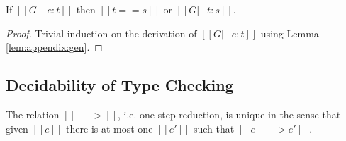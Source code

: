 \begin{lem}\label{lem:appendix:corrtyp}
    If $[[G |- e:t]]$ then $[[t == s]]$ or $[[G |- t : s]]$.
\end{lem}

\begin{proof}
    Trivial induction on the derivation of $[[G |- e:t]]$ using Lemma
\ref{lem:appendix:gen}.
\end{proof}

\subsection{Decidability of Type Checking}
\begin{lem}\label{lem:appendix:unired}
	The relation $[[-->]]$, i.e. one-step reduction, is unique in the sense that
given $[[e]]$ there is at most one $[[e']]$ such that $[[e --> e']]$.
\end{lem}

